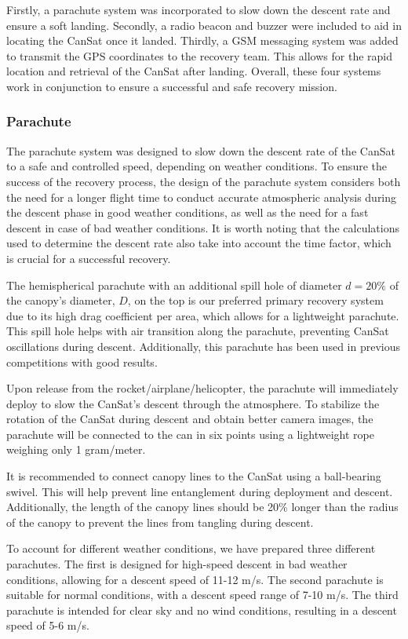 \documentclass[11pt]{article}
\begin{document}
Firstly, a parachute system was incorporated to slow down the descent rate and ensure a soft landing. Secondly, a radio beacon and buzzer were included to aid in locating the CanSat once it landed. Thirdly, a GSM messaging system was added to transmit the GPS coordinates to the recovery team. This allows for the rapid location and retrieval of the CanSat after landing. Overall, these four systems work in conjunction to ensure a successful and safe recovery mission.

\subsubsection{Parachute}
The parachute system was designed to slow down the descent rate of the CanSat to a safe and controlled speed, depending on weather conditions. To ensure the success of the recovery process, the design of the parachute system considers both the need for a longer flight time to conduct accurate atmospheric analysis during the descent phase in good weather conditions, as well as the need for a fast descent in case of bad weather conditions. It is worth noting that the calculations used to determine the descent rate also take into account the time factor, which is crucial for a successful recovery.

The hemispherical parachute with an additional spill hole of diameter $d=20\%$ of the canopy's diameter, $D$, on the top is our preferred primary recovery system due to its high drag coefficient per area, which allows for a lightweight parachute. This spill hole helps with air transition along the parachute, preventing CanSat oscillations during descent. Additionally, this parachute has been used in previous competitions with good results. 

Upon release from the rocket/airplane/helicopter, the parachute will immediately deploy to slow the CanSat's descent through the atmosphere. To stabilize the rotation of the CanSat during descent and obtain better camera images, the parachute will be connected to the can in six points using a lightweight rope weighing only 1 gram/meter.

It is recommended to connect canopy lines to the CanSat using a ball-bearing swivel. This will help prevent line entanglement during deployment and descent. Additionally, the length of the canopy lines should be 20\% longer than the radius of the canopy to prevent the lines from tangling during descent.

To account for different weather conditions, we have prepared three different parachutes. The first is designed for high-speed descent in bad weather conditions, allowing for a descent speed of 11-12 m/s. The second parachute is suitable for normal conditions, with a descent speed range of 7-10 m/s. The third parachute is intended for clear sky and no wind conditions, resulting in a descent speed of 5-6 m/s.
\end{document}
